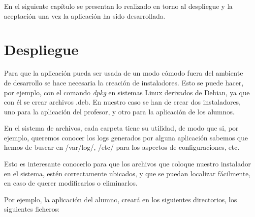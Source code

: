
\label{chap:despliegue}

En el siguiente capítulo se presentan lo realizado en torno al despliegue y la aceptación una vez la aplicación ha sido desarrollada.

\chaptertoc

\section{Despliegue}
\label{sec:despliegue:despliegue}

Para que la aplicación pueda ser usada de un modo cómodo fuera del ambiente de desarrollo se hace necesaria la creación de instaladores. Esto se puede hacer, por ejemplo, con el comando \emph{dpkg} en sistemas Linux derivados de Debian\cite{DEBIAN:2005}, ya que con él se crear archivos .deb. En nuestro caso se han de crear dos instaladores, uno para la aplicación del profesor, y otro para la aplicación de los alumnos.
\newline

En el sistema de archivos, cada carpeta tiene su utilidad, de modo que si, por ejemplo, queremos conocer los logs generados por alguna aplicación sabemos que hemos de buscar en /var/log/, /etc/ para los aspectos de configuraciones, etc.
\newline

Esto es interesante conocerlo para que los archivos que coloque nuestro instalador en el sistema, estén correctamente ubicados, y que se puedan localizar fácilmente, en caso de querer modificarlos o eliminarlos.
\newline

Por ejemplo, la aplicación del alumno, creará en los siguientes directorios, los siguientes ficheros:


